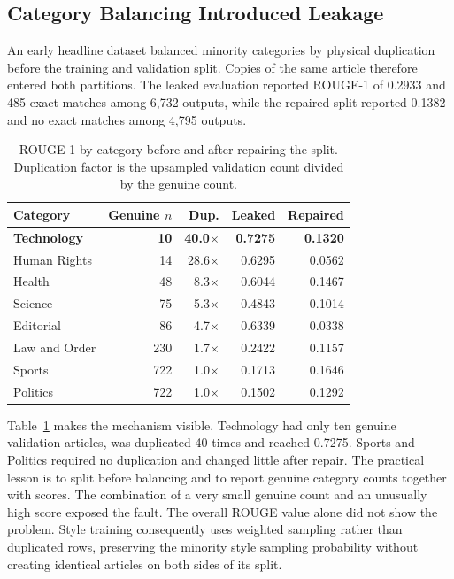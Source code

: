 \documentclass[a4paper,conference]{IEEEtran}
\begin{document}
\subsection{Category Balancing Introduced Leakage}
\label{sec:leak}
An early headline dataset balanced minority categories by physical duplication
before the training and validation split. Copies of the same article therefore entered
both partitions. The leaked evaluation reported ROUGE-1 of 0.2933 and 485 exact
matches among 6,732 outputs, while the repaired split reported 0.1382 and no
exact matches among 4,795 outputs.

\begin{table}[!b]
\caption{ROUGE-1 by category before and after repairing the split. Duplication factor is the upsampled validation count divided by the genuine count. }
\label{tab:leak}
\centering
\footnotesize
\setlength{\tabcolsep}{3pt}
\renewcommand{\arraystretch}{1.04}
\begin{tabular}{|l|r|r|r|r|}
\hline
\textbf{Category} & \textbf{Genuine $n$} & \textbf{Dup.} & \textbf{Leaked} & \textbf{Repaired} \\
\hline
\rowcolor{gray!10}
\textbf{Technology} & \textbf{10} & \textbf{40.0$\times$} & \textbf{0.7275} & \textbf{0.1320} \\
\hline
Human Rights  & 14  & 28.6$\times$ & 0.6295 & 0.0562 \\
\hline
Health        & 48  & 8.3$\times$  & 0.6044 & 0.1467 \\
\hline
Science       & 75  & 5.3$\times$  & 0.4843 & 0.1014 \\
\hline
Editorial     & 86  & 4.7$\times$  & 0.6339 & 0.0338 \\
\hline
Law and Order & 230 & 1.7$\times$  & 0.2422 & 0.1157 \\
\hline
Sports        & 722 & 1.0$\times$  & 0.1713 & 0.1646 \\
\hline
Politics      & 722 & 1.0$\times$  & 0.1502 & 0.1292 \\
\hline
\end{tabular}
\end{table}

Table~\ref{tab:leak} makes the mechanism visible. Technology had only ten
genuine validation articles, was duplicated 40 times and reached 0.7275.
Sports and Politics required no duplication and changed little after repair.
The practical lesson is to split before balancing and to report genuine
category counts together with scores. The combination of a very small genuine count
and an unusually high score exposed the fault.
The overall ROUGE value alone did not show the problem. Style training consequently uses weighted
sampling rather than duplicated rows, preserving the minority style sampling
probability without creating identical articles on both sides of its split.
\end{document}

